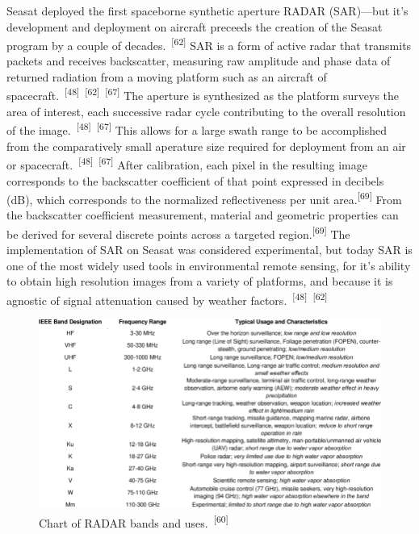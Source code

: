 \documentclass{article}
\begin{document}
\par{Seasat deployed the first spaceborne synthetic aperture RADAR (SAR)---but it's development and deployment on aircraft preceeds the creation of the Seasat program by a couple of decades.~\textsuperscript{[62]} SAR is a form of active radar that transmits packets and receives backscatter, measuring raw amplitude and phase data of returned radiation from a moving platform such as an aircraft of spacecraft.~\textsuperscript{[48]}~\textsuperscript{[62]}~\textsuperscript{[67]} The aperture is synthesized as the platform surveys the area of interest, each successive radar cycle contributing to the overall resolution of the image.~\textsuperscript{[48]}~\textsuperscript{[67]} This allows for a large swath range to be accomplished from the comparatively small aperature size required for deployment from an air or spacecraft.~\textsuperscript{[48]}~\textsuperscript{[67]} After calibration, each pixel in the resulting image corresponds to the backscatter coefficient of that point expressed in decibels (dB), which corresponds to the normalized reflectiveness per unit area.\textsuperscript{[69]} From the backscatter coefficient measurement, material and geometric properties can be derived for several discrete points across a targeted region.\textsuperscript{[69]} The implementation of SAR on Seasat was considered experimental, but today SAR is one of the most widely used tools in environmental remote sensing, for it's ability to obtain high resolution images from a variety of platforms, and because it is agnostic of signal attenuation caused by weather factors.~\textsuperscript{[48]}~\textsuperscript{[62]}}


\begin{figure}
    \centering
    \includegraphics[width=1\linewidth]{images/radar-bands.png}
    \caption{Chart of RADAR bands and uses.~\textsuperscript{[60]}}
    \label{figure19}
\end{figure}
\end{document}
